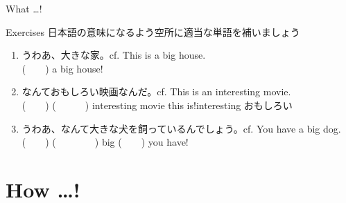 \documentclass[aspectratio=169,xcolor={dvipsnames,table}]{beamer}
\begin{document}
\begin{frame}[plain]{What \ldots ! }
\hypertarget{WHAT}{}
\hfill\hyperlink{HOW}{}
\end{frame}
\begin{frame}[plain]{Exercises}
日本語の意味になるよう空所に適当な単語を補いましょう
 \begin{enumerate}
  \item うわあ、大きな家。\hfill{\scriptsize cf. This is a big house.}\\
	(~~~~) a big house!
  \item なんておもしろい映画なんだ。\hfill{\scriptsize cf. This is an interesting movie.}\\
	(~~~~) (~~~~~~) interesting movie this is!\hfill{\scriptsize interesting  おもしろい}
  \item うわあ、なんて大きな犬を飼っているんでしょう。\hfill{\scriptsize cf. You have a big dog.}\\
	(~~~~) (~~~~~~~~) big (~~~~) you have!
 \end{enumerate}
\hfill{\scriptsize {}}

\end{frame}
\section{How \ldots ! }
\end{document}
